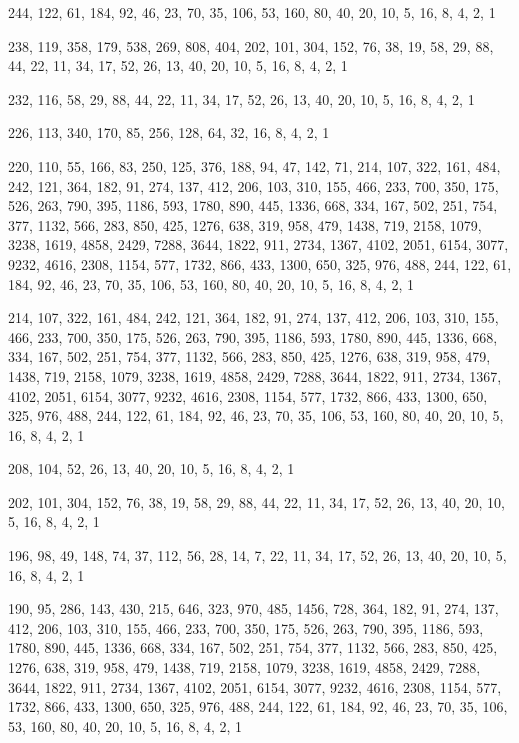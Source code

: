\documentclass[12pt]{article}
\begin{document}
244, 122, 61, 184, 92, 46, 23, 70, 35, 106, 53, 160, 80, 40, 20, 10, 5, 16, 8, 4, 2, 1

238, 119, 358, 179, 538, 269, 808, 404, 202, 101, 304, 152, 76, 38, 19, 58, 29, 88, 44, 22, 11, 34, 17, 52, 26, 13, 40, 20, 10, 5, 16, 8, 4, 2, 1

232, 116, 58, 29, 88, 44, 22, 11, 34, 17, 52, 26, 13, 40, 20, 10, 5, 16, 8, 4, 2, 1

226, 113, 340, 170, 85, 256, 128, 64, 32, 16, 8, 4, 2, 1

220, 110, 55, 166, 83, 250, 125, 376, 188, 94, 47, 142, 71, 214, 107, 322, 161, 484, 242, 121, 364, 182, 91, 274, 137, 412, 206, 103, 310, 155, 466, 233, 700, 350, 175, 526, 263, 790, 395, 1186, 593, 1780, 890, 445, 1336, 668, 334, 167, 502, 251, 754, 377, 1132, 566, 283, 850, 425, 1276, 638, 319, 958, 479, 1438, 719, 2158, 1079, 3238, 1619, 4858, 2429, 7288, 3644, 1822, 911, 2734, 1367, 4102, 2051, 6154, 3077, 9232, 4616, 2308, 1154, 577, 1732, 866, 433, 1300, 650, 325, 976, 488, 244, 122, 61, 184, 92, 46, 23, 70, 35, 106, 53, 160, 80, 40, 20, 10, 5, 16, 8, 4, 2, 1

214, 107, 322, 161, 484, 242, 121, 364, 182, 91, 274, 137, 412, 206, 103, 310, 155, 466, 233, 700, 350, 175, 526, 263, 790, 395, 1186, 593, 1780, 890, 445, 1336, 668, 334, 167, 502, 251, 754, 377, 1132, 566, 283, 850, 425, 1276, 638, 319, 958, 479, 1438, 719, 2158, 1079, 3238, 1619, 4858, 2429, 7288, 3644, 1822, 911, 2734, 1367, 4102, 2051, 6154, 3077, 9232, 4616, 2308, 1154, 577, 1732, 866, 433, 1300, 650, 325, 976, 488, 244, 122, 61, 184, 92, 46, 23, 70, 35, 106, 53, 160, 80, 40, 20, 10, 5, 16, 8, 4, 2, 1

208, 104, 52, 26, 13, 40, 20, 10, 5, 16, 8, 4, 2, 1

202, 101, 304, 152, 76, 38, 19, 58, 29, 88, 44, 22, 11, 34, 17, 52, 26, 13, 40, 20, 10, 5, 16, 8, 4, 2, 1

196, 98, 49, 148, 74, 37, 112, 56, 28, 14, 7, 22, 11, 34, 17, 52, 26, 13, 40, 20, 10, 5, 16, 8, 4, 2, 1

190, 95, 286, 143, 430, 215, 646, 323, 970, 485, 1456, 728, 364, 182, 91, 274, 137, 412, 206, 103, 310, 155, 466, 233, 700, 350, 175, 526, 263, 790, 395, 1186, 593, 1780, 890, 445, 1336, 668, 334, 167, 502, 251, 754, 377, 1132, 566, 283, 850, 425, 1276, 638, 319, 958, 479, 1438, 719, 2158, 1079, 3238, 1619, 4858, 2429, 7288, 3644, 1822, 911, 2734, 1367, 4102, 2051, 6154, 3077, 9232, 4616, 2308, 1154, 577, 1732, 866, 433, 1300, 650, 325, 976, 488, 244, 122, 61, 184, 92, 46, 23, 70, 35, 106, 53, 160, 80, 40, 20, 10, 5, 16, 8, 4, 2, 1
\end{document}
